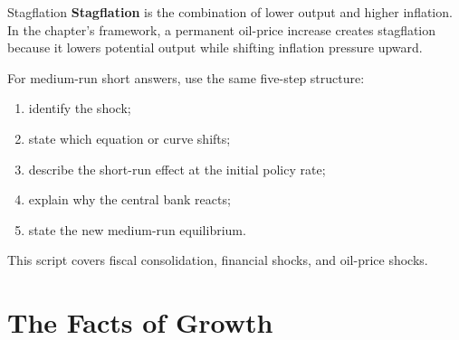 \documentclass[12pt]{article}
\begin{document}
\begin{center}
\end{center}

\begin{definition}{Stagflation}{}
\textbf{Stagflation} is the combination of lower output and higher inflation. In the chapter's framework, a permanent oil-price increase creates stagflation because it lowers potential output while shifting inflation pressure upward.
\end{definition}

\begin{examtip}[title={Exam Focus: Standard Chapter 7 script}]
For medium-run short answers, use the same five-step structure:
\begin{enumerate}[leftmargin=1.5em]
\item identify the shock;
\item state which equation or curve shifts;
\item describe the short-run effect at the initial policy rate;
\item explain why the central bank reacts;
\item state the new medium-run equilibrium.
\end{enumerate}
This script covers fiscal consolidation, financial shocks, and oil-price shocks.
\end{examtip}

\newpage
\section{The Facts of Growth}
\end{document}
